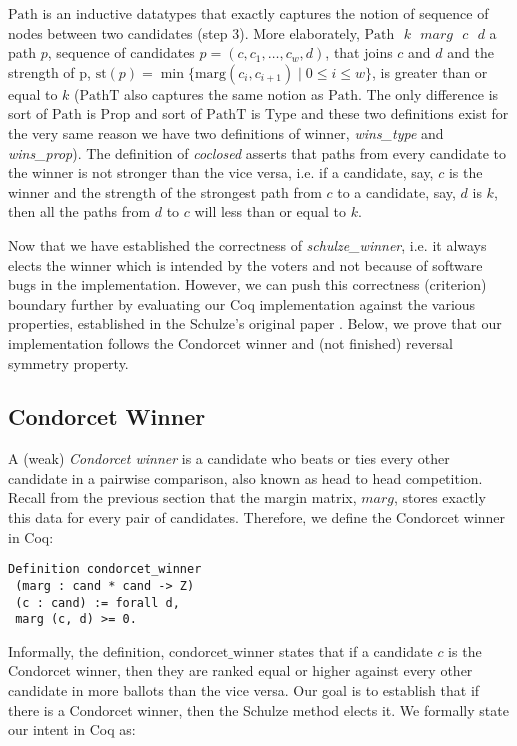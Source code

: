 \documentclass[compsoc,conference,a4paper,10pt,times]{IEEEtran}
\begin{document}
\noindent
$\mathrm{Path}$ is an inductive datatypes that exactly captures the notion of 
sequence of nodes between two candidates (step 3). 
More elaborately, 
$\mathrm{Path} \text{ }k \text{ }marg \text{ }c \text{ }d$ a path $p$, sequence of candidates 
$p= (c,c_{1}, \dots ,c_{w},d)$, that joins $c$ and $d$ and the strength of 
p, $\mathrm{st}(p) =  \min \lbrace \mathrm{marg} (c_i, c_{i+1}) \mid 0 
\leq i \leq w \rbrace$, is greater than or equal to $k$ ($\mathrm{PathT}$ also captures 
the same notion as $\mathrm{Path}$. The only difference is sort of $\mathrm{Path}$ is Prop 
and sort of $\mathrm{PathT}$ is Type and these two definitions exist for the very same reason 
we have two definitions of winner,  \textit{wins\_type} and \textit{wins\_prop}).
The definition of \textit{coclosed} asserts that
paths from every candidate to the winner 
is not stronger than the vice versa, i.e.
if a candidate, say, $c$ is the winner and the strength 
of the strongest path from $c$ to a candidate,  say, $d$ is $k$, 
then all the paths from $d$ to $c$ will less than or equal to $k$.


Now that we have established the correctness of \textit{schulze\_winner},
i.e. it always elects the winner which is intended by the voters and 
not because of software bugs in the implementation.  However, we can push this
correctness (criterion) boundary further by evaluating our Coq implementation against 
the various properties, established in the Schulze's 
original paper \cite{Schulze:2011:NMC}. Below, we prove that our 
implementation follows the Condorcet winner and (not finished)
reversal symmetry property. 


 
\subsection{Condorcet Winner}
	A (weak) \textit{Condorcet winner} is a candidate who beats or ties 
	every other candidate in a 
	pairwise comparison, also known as head to head competition. 
	Recall from the previous section that the margin matrix, $marg$, 
	stores exactly this data for every pair of candidates.
	Therefore, we define the Condorcet winner in Coq:

\begin{verbatim}
Definition condorcet_winner 
 (marg : cand * cand -> Z) 
 (c : cand) := forall d, 
 marg (c, d) >= 0.
\end{verbatim}

  Informally, the definition, $\mathrm{condorcet\_winner}$ states that 
  if a candidate $c$  is the Condorcet winner, then they are
  ranked equal or higher against
  every other candidate in more ballots than the vice versa. 
  Our goal is to establish that if there is a 
  Condorcet winner, then the Schulze method
  elects it. We formally state our intent 
  in Coq as:
 	
\end{document}
